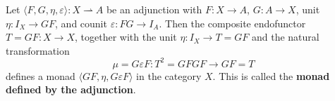 Let $\langle F, G, \eta, \varepsilon \rangle : X \rightharpoonup A$ be an adjunction with
$F: X \to A$, $G: A \to X$, unit $\eta: I_X \to GF$, and counit $\varepsilon: FG \to I_A$.
Then the composite endofunctor $T = GF: X \to X$, together with the unit $\eta: I_X \to T = GF$
and the natural transformation
$$\mu = G\varepsilon F: T^2 = GFGF \to GF = T$$
defines a monad $\langle GF, \eta, G\varepsilon F \rangle$ in the category $X$.
This is called the \textbf{monad defined by the adjunction}.
